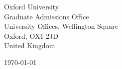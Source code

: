 \begin{minipage}{0.49\textwidth}
\begin{flushleft}
\noindent
Oxford University\\
Graduate Admissions Office \\
University Offices, Wellington Square\\
Oxford, OX1 2JD\\
United Kingdom 
\end{flushleft}
\end{minipage}
\begin{minipage}{0.47\textwidth}
\begin{flushright}
\today
\end{flushright}
\end{minipage} \\

\newcommand{\univ}{Oxford University}
\newcommand{\univshort}{Oxford}
\newcommand{\degree}{D.Phil.}
\newcommand{\dept}{Computer Science}
